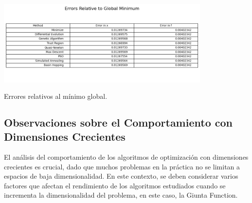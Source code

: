 \documentclass[fontsize=10pt]{article}
\begin{document}
\begin{table}[h!]
    \centering
    \includegraphics[width=0.8\textwidth]{images/errors_relative_table.png}
    \caption{Errores relativos al mínimo global.}
    \label{tab:errors_relative_table}
\end{table}

\subsection{Observaciones sobre el Comportamiento con Dimensiones Crecientes}

El análisis del comportamiento de los algoritmos de optimización con dimensiones 
crecientes es crucial, dado que muchos problemas en la práctica no se limitan a 
espacios de baja dimensionalidad. En este contexto, se deben considerar varios 
factores que afectan el rendimiento de los algoritmos estudiados cuando se 
incrementa la dimensionalidad del problema, en este caso, la Giunta Function.
\end{document}
